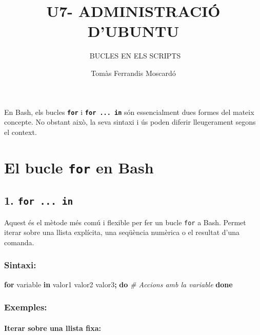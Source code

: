 \documentclass[
  12 pt,
  a4paper,
]{article}
\title{U7- ADMINISTRACIÓ D'UBUNTU}
\subtitle{~BUCLES EN ELS SCRIPTS}
\author{Tomàs Ferrandis Moscardó}
\date{}
\newenvironment{Shaded}{\begin{snugshade}}{\end{snugshade}}
\newcommand{\CommentTok}[1]{\textcolor[rgb]{0.56,0.35,0.01}{\textit{#1}}}
\newcommand{\ControlFlowTok}[1]{\textcolor[rgb]{0.13,0.29,0.53}{\textbf{#1}}}
\newcommand{\KeywordTok}[1]{\textcolor[rgb]{0.13,0.29,0.53}{\textbf{#1}}}
\newcommand{\NormalTok}[1]{#1}
\begin{document}
\maketitle

En Bash, els bucles \textbf{\texttt{for}} i
\textbf{\texttt{for\ ...\ in}} són essencialment dues formes del mateix
concepte. No obstant això, la seva sintaxi i ús poden diferir
lleugerament segons el context.

\section{\texorpdfstring{\textbf{El bucle \texttt{for} en
Bash}}{El bucle for en Bash}}\label{el-bucle-for-en-bash}

\subsection{\texorpdfstring{\textbf{1.
\texttt{for\ ...\ in}}}{1. for ... in}}\label{for-...-in}

Aquest és el mètode més comú i flexible per fer un bucle \texttt{for} a
Bash. Permet iterar sobre una llista explícita, una seqüència numèrica o
el resultat d'una comanda.

\subsubsection{\texorpdfstring{\textbf{Sintaxi}:}{Sintaxi:}}\label{sintaxi}

\begin{Shaded}
\begin{Highlighting}[]
\ControlFlowTok{for}\NormalTok{ variable }\KeywordTok{in}\NormalTok{ valor1 valor2 valor3}\KeywordTok{;} \ControlFlowTok{do}
    \CommentTok{\# Accions amb la variable}
\ControlFlowTok{done}
\end{Highlighting}
\end{Shaded}

\subsubsection{\texorpdfstring{\textbf{Exemples}:}{Exemples:}}\label{exemples}

\paragraph{Iterar sobre una llista
fixa:}\label{iterar-sobre-una-llista-fixa}
\end{document}
